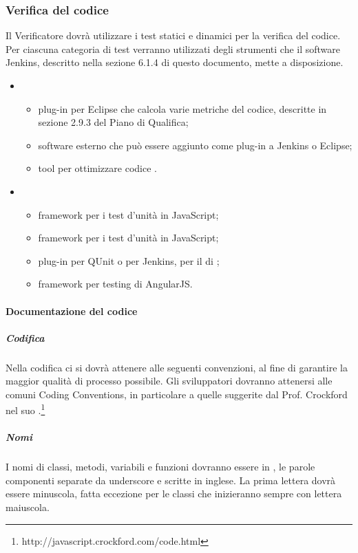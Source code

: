 \subsubsection{Verifica del codice}
Il Verificatore dovrà utilizzare i test statici e dinamici per la verifica del codice. Per ciascuna categoria di test verranno utilizzati degli strumenti che il software Jenkins, descritto nella sezione 6.1.4 di questo documento, mette a disposizione.
\begin{itemize}
\item {}
\begin{itemize}
\item {}plug-in per Eclipse che calcola varie metriche del codice, descritte in sezione 2.9.3 del Piano di Qualifica;
\item {}software esterno che può essere aggiunto come plug-in a Jenkins o Eclipse;
\item {}tool per ottimizzare codice .
\end{itemize}
\item {}
\begin{itemize}
\item {}framework per i test d'unità in JavaScript;
\item {}framework per i test d'unità in JavaScript;
\item {}plug-in per QUnit o per Jenkins, per il  di ;
\item {}framework per testing di AngularJS.
\end{itemize}
\end{itemize}

\paragraph{Documentazione del codice}

\subparagraph{Codifica}
\label{}
Nella codifica ci si dovrà attenere alle seguenti convenzioni, al fine di garantire la maggior qualità di processo possibile.
Gli sviluppatori dovranno attenersi alle comuni Coding Conventions, in particolare a quelle suggerite dal Prof. Crockford nel suo .\footnote{http://javascript.crockford.com/code.html}\\

\subparagraph{Nomi}
\label{}
I nomi di classi, metodi, variabili e funzioni dovranno essere in , le parole componenti separate da underscore e scritte in inglese.
La prima lettera dovrà essere minuscola, fatta eccezione per le classi che inizieranno sempre con lettera maiuscola.

